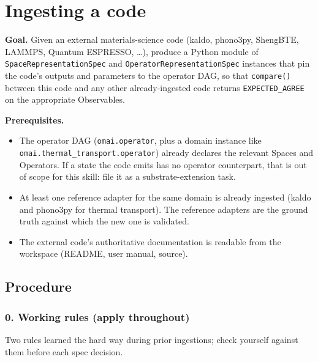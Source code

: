 \documentclass[11pt,a4paper]{article}
\begin{document}
\section{Ingesting a code}
\label{app:ingest}

\noindent\textbf{Goal.} Given an external materials-science code (kaldo,
phono3py, ShengBTE, LAMMPS, Quantum ESPRESSO, \ldots), produce a Python module of
\texttt{SpaceRepresentationSpec} and \texttt{OperatorRepresentationSpec} instances
that pin the code's outputs and parameters to the operator DAG, so that
\texttt{compare()} between this code and any other already-ingested code returns
\texttt{EXPECTED\_AGREE} on the appropriate Observables.

\noindent\textbf{Prerequisites.}
\begin{itemize}[leftmargin=2em]
  \item The operator DAG (\texttt{omai.operator}, plus a domain instance like
        \texttt{omai.thermal\_transport.operator}) already declares the relevant
        Spaces and Operators. If a state the code emits has no operator
        counterpart, that is out of scope for this skill: file it as a
        substrate-extension task.
  \item At least one reference adapter for the same domain is already ingested
        (kaldo and phono3py for thermal transport). The reference adapters are the
        ground truth against which the new one is validated.
  \item The external code's authoritative documentation is readable from the
        workspace (README, user manual, source).
\end{itemize}

\subsection{Procedure}

\subsubsection*{0. Working rules (apply throughout)}

Two rules learned the hard way during prior ingestions; check yourself against
them before each spec decision.
\end{document}
